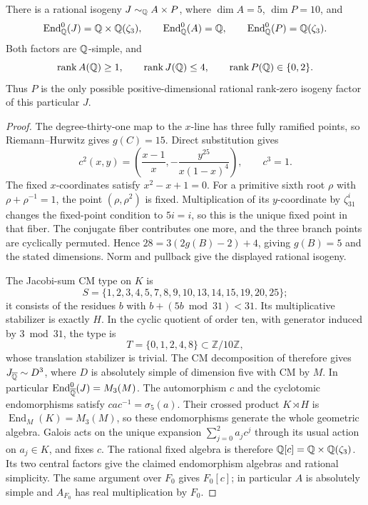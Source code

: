 \begin{proposition}
\label{prop:thirtyone-rational-factors}
There is a rational isogeny $J\sim_\mathbb Q A\times P$, where
$\dim A=5$, $\dim P=10$, and
\[
 \operatorname{End}^0_\mathbb Q(J)=\mathbb Q\times\mathbb Q(\zeta_3),\qquad
 \operatorname{End}^0_\mathbb Q(A)=\mathbb Q,\qquad
 \operatorname{End}^0_\mathbb Q(P)=\mathbb Q(\zeta_3).
\]
Both factors are $\mathbb Q$-simple, and
\[
 \operatorname{rank}A(\mathbb Q)\ge1,\qquad
 \operatorname{rank}J(\mathbb Q)\le4,\qquad
 \operatorname{rank}P(\mathbb Q)\in\{0,2\}.
\]
Thus $P$ is the only possible positive-dimensional rational
rank-zero isogeny factor of this particular $J$.
\end{proposition}
\begin{proof}
The degree-thirty-one map to the $x$-line has three fully ramified
points, so Riemann--Hurwitz gives $g(C)=15$.
Direct substitution gives
\[
 c^2(x,y)=\left(\frac{x-1}{x},-\frac{y^{25}}{x(1-x)^4}\right),
 \qquad c^3=1.
\]
The fixed $x$-coordinates satisfy $x^2-x+1=0$.
For a primitive sixth root $\rho$ with $\rho+\rho^{-1}=1$,
the point $(\rho,\rho^2)$ is fixed. Multiplication of its
$y$-coordinate by $\zeta_{31}^i$ changes the fixed-point condition
to $5i=i$, so this is the unique fixed point in that fiber.
The conjugate fiber contributes one more, and the three branch
points are cyclically permuted. Hence
$28=3(2g(B)-2)+4$, giving $g(B)=5$ and the stated dimensions.
Norm and pullback give the displayed rational isogeny.

The Jacobi-sum CM type on $K$ is
\[
 S=\{1,2,3,4,5,7,8,9,10,13,14,15,19,20,25\};
\]
it consists of the residues $b$ with $b+(5b\bmod31)<31$.
Its multiplicative stabilizer is exactly $H$. In the cyclic
quotient of order ten, with generator induced by $3\bmod31$,
the type is
\[
 T=\{0,1,2,4,8\}\subset\mathbb Z/10\mathbb Z,
\]
whose translation stabilizer is trivial. The CM decomposition
of \citet[Lemma~1.6, pp.~206--207]{GrossRohrlich1978} therefore
gives $J_{\overline{\mathbb Q}}\sim D^3$, where $D$ is absolutely simple
of dimension five with CM by $M$. In particular
$\operatorname{End}^0_{\overline{\mathbb Q}}(J)=M_3(M)$.
The automorphism $c$ and the cyclotomic endomorphisms satisfy
$cac^{-1}=\sigma_5(a)$. Their crossed product $K\rtimes H$ is
$\operatorname{End}_M(K)=M_3(M)$, so these endomorphisms generate
the whole geometric algebra. Galois acts on the unique expansion
$\sum_{j=0}^2a_jc^j$ through its usual action on $a_j\in K$,
and fixes $c$. The rational fixed algebra is therefore
$\mathbb Q[c]=\mathbb Q\times\mathbb Q(\zeta_3)$. Its two central factors give the
claimed endomorphism algebras and rational simplicity.
The same argument over $F_0$ gives $F_0[c]$; in particular $A$
is absolutely simple and $A_{F_0}$ has real multiplication by $F_0$.


\end{proof}
